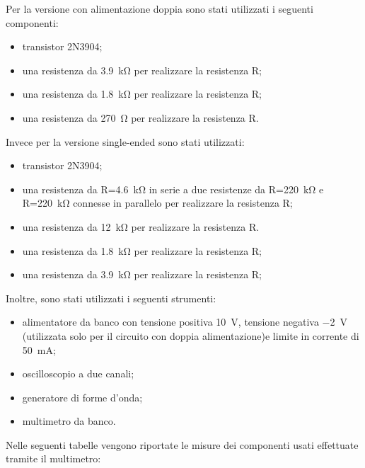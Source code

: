 \noindent
Per la versione con alimentazione doppia sono stati utilizzati i seguenti componenti:
\begin{itemize}
	\item transistor 2N3904;
	\item una resistenza da \SI{3.9}{\kilo\ohm} per realizzare la resistenza R;
	\item una resistenza da \SI{1.8}{\kilo\ohm} per realizzare la resistenza R;
	\item una resistenza da \SI{270}{\ohm} per realizzare la resistenza R.
\end{itemize}
Invece per la versione single-ended sono stati utilizzati:
\begin{itemize}
	\item transistor 2N3904;
	\item una resistenza da R=\SI{4.6}{\kilo\ohm} in serie a due resistenze da R=\SI{220}{\kilo\ohm} e R=\SI{220}{\kilo\ohm} connesse in parallelo per realizzare la resistenza R;
	\item una resistenza da \SI{12}{\kilo\ohm} per realizzare la resistenza R.
	\item una resistenza da \SI{1.8}{\kilo\ohm} per realizzare la resistenza R;
	\item una resistenza da \SI{3.9}{\kilo\ohm} per realizzare la resistenza R;
\end{itemize}

Inoltre, sono stati utilizzati i seguenti strumenti:
\begin{itemize}
	\item alimentatore da banco con tensione positiva \SI{10}{\volt}, tensione negativa \SI{-2}{\volt} (utilizzata solo per il circuito con doppia alimentazione)e limite in corrente di \SI{50}{\milli\ampere};
	\item oscilloscopio a due canali;
	\item generatore di forme d'onda;
	\item multimetro da banco.
\end{itemize}

\noindent
Nelle seguenti tabelle vengono riportate le misure dei componenti usati effettuate tramite il multimetro:

